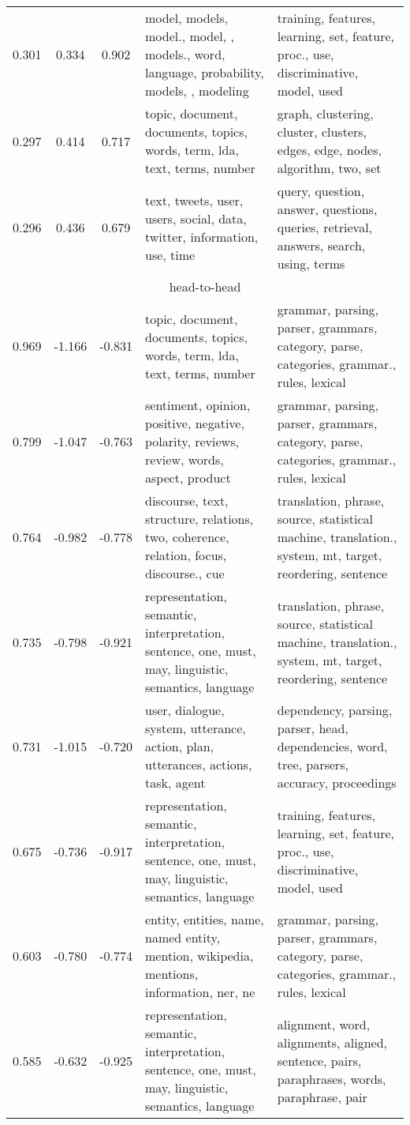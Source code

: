 \begin{tabular}{cccp{5cm}p{5cm}}
0.301 & 0.334 & 0.902 & model, models, model., model, , models., word, language, probability, models, , modeling & training, features, learning, set, feature, proc., use, discriminative, model, used \\
0.297 & 0.414 & 0.717 & topic, document, documents, topics, words, term, lda, text, terms, number & graph, clustering, cluster, clusters, edges, edge, nodes, algorithm, two, set \\
0.296 & 0.436 & 0.679 & text, tweets, user, users, social, data, twitter, information, use, time & query, question, answer, questions, queries, retrieval, answers, search, using, terms \\
\midrule
\multicolumn{5}{c}{head-to-head}\\
0.969 & -1.166 & -0.831 & topic, document, documents, topics, words, term, lda, text, terms, number & grammar, parsing, parser, grammars, category, parse, categories, grammar., rules, lexical \\
0.799 & -1.047 & -0.763 & sentiment, opinion, positive, negative, polarity, reviews, review, words, aspect, product & grammar, parsing, parser, grammars, category, parse, categories, grammar., rules, lexical \\
0.764 & -0.982 & -0.778 & discourse, text, structure, relations, two, coherence, relation, focus, discourse., cue & translation, phrase, source, statistical machine, translation., system, mt, target, reordering, sentence \\
0.735 & -0.798 & -0.921 & representation, semantic, interpretation, sentence, one, must, may, linguistic, semantics, language & translation, phrase, source, statistical machine, translation., system, mt, target, reordering, sentence \\
0.731 & -1.015 & -0.720 & user, dialogue, system, utterance, action, plan, utterances, actions, task, agent & dependency, parsing, parser, head, dependencies, word, tree, parsers, accuracy, proceedings \\
0.675 & -0.736 & -0.917 & representation, semantic, interpretation, sentence, one, must, may, linguistic, semantics, language & training, features, learning, set, feature, proc., use, discriminative, model, used \\
0.603 & -0.780 & -0.774 & entity, entities, name, named entity, mention, wikipedia, mentions, information, ner, ne & grammar, parsing, parser, grammars, category, parse, categories, grammar., rules, lexical \\
0.585 & -0.632 & -0.925 & representation, semantic, interpretation, sentence, one, must, may, linguistic, semantics, language & alignment, word, alignments, aligned, sentence, pairs, paraphrases, words, paraphrase, pair \\

\end{tabular}
